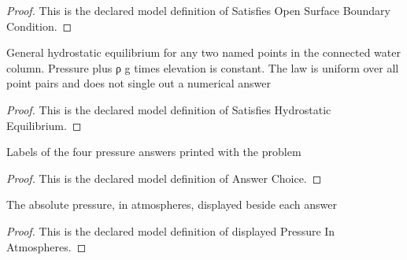 \begin{proof}
  This is the declared model definition of Satisfies Open Surface Boundary Condition.
\end{proof}
\begin{definition}
  \label{def:physics:phyx-mini-0721:phyxminiproblems-problemphyxmini0721-satisfieshydrostaticequilibrium}
  General hydrostatic equilibrium for any two named points in the connected water column. Pressure plus ρ g times elevation is constant. The law is uniform over all point pairs and does not single out a numerical answer
\end{definition}
\begin{proof}
  This is the declared model definition of Satisfies Hydrostatic Equilibrium.
\end{proof}
\begin{definition}
  \label{def:physics:phyx-mini-0721:phyxminiproblems-problemphyxmini0721-answerchoice}
  Labels of the four pressure answers printed with the problem
\end{definition}
\begin{proof}
  This is the declared model definition of Answer Choice.
\end{proof}
\begin{definition}
  \label{def:physics:phyx-mini-0721:phyxminiproblems-problemphyxmini0721-displayedpressureinatmospheres}
  The absolute pressure, in atmospheres, displayed beside each answer
\end{definition}
\begin{proof}
  This is the declared model definition of displayed Pressure In Atmospheres.
\end{proof}
